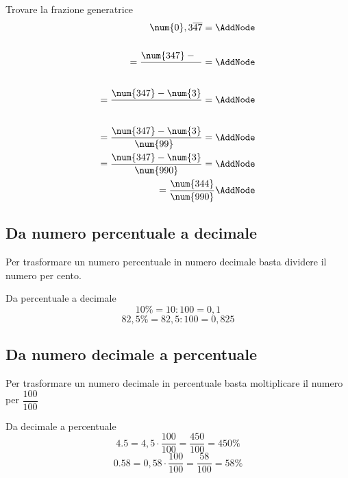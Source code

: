 \begin{esempio}
 \begin{NodesList}
 Trovare la frazione generatrice
	\begin{align*}
	\num{0},3\overline{47}=\AddNode\\[.5cm] 
	=\dfrac{\num{347} -\phantom{3}}{\phantom{99}}=\AddNode\\[.5cm] %
	=\dfrac{\num{347}-\num{3}}{\phantom{99}}=\AddNode\\[.5cm]
	=\dfrac{\num{347}-\num{3}}{\num{99}\phantom{0}}=\AddNode\\
	=\dfrac{\num{347}-\num{3}}{\num{990}}=\AddNode\\
	=\dfrac{\num{344}}{\num{990}}\AddNode
	\end{align*}
	\end{NodesList}
\end{esempio}
\subsection{Da numero percentuale a decimale}
Per trasformare un numero percentuale in numero decimale basta dividere il numero per cento. 
\begin{esempio}
Da percentuale a decimale
\[10\%= 10:100=0,1 \] \[82,5\%= 82,5:100=0,825 \]
\end{esempio}
\subsection{Da numero decimale a percentuale}
Per trasformare un numero decimale in percentuale basta moltiplicare il numero per $\dfrac{100}{100}$
\begin{esempio}
Da decimale a percentuale
\[\num{4,5}=4,5\cdot\dfrac{100}{100}=\dfrac{450}{100}=450\%\]
\[\num{0,58}=0{,}58\cdot\dfrac{100}{100}=\dfrac{58}{100}=58\%\]
\end{esempio}
